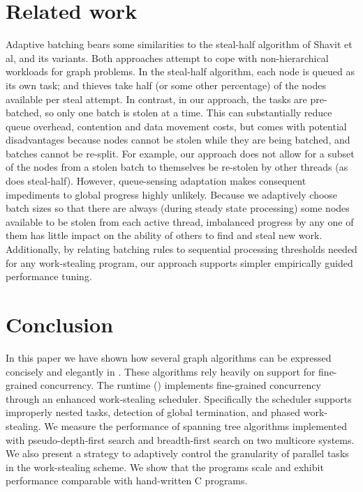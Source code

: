 \section{Related work}\label{sec:related}
Adaptive batching bears some similarities to the steal-half algorithm
of Shavit et al, and its variants. Both approaches attempt to cope
with non-hierarchical workloads for graph problems. In the steal-half
algorithm, each node is queued as its own task; and thieves take half
(or some other percentage) of the nodes available per steal
attempt. In contrast, in our approach, the tasks are pre-batched, so
only one batch is stolen at a time. This can substantially reduce
queue overhead, contention and data movement costs, but comes with
potential disadvantages because nodes cannot be stolen while they are
being batched, and batches cannot be re-split.  For example, our
approach does not allow for a subset of the nodes from a stolen batch
to themselves be re-stolen by other threads (as does
steal-half). However, queue-sensing adaptation makes consequent
impediments to global progress highly unlikely.  Because we adaptively
choose batch sizes so that there are always (during steady state
processing) some nodes available to be stolen from each active thread,
imbalanced progress by any one of them has little impact on the
ability of others to find and steal new work.  Additionally, by
relating batching rules to sequential processing thresholds needed for
any work-stealing program, our approach supports simpler empirically
guided performance tuning.
\section{Conclusion}\label{sec:concl}
In this paper we have shown how several graph algorithms can be
expressed concisely and elegantly in \Xten. These algorithms rely
heavily on support for fine-grained concurrency. The \Xten{} runtime
(\XWS) implements fine-grained concurrency through an enhanced
work-stealing scheduler. Specifically the scheduler supports
improperly nested tasks, detection of global termination, and phased
work-stealing.  We measure the performance of spanning tree algorithms
implemented with pseudo-depth-first search and breadth-first search on
two multicore systems. We also present a strategy to adaptively control the granularity of parallel tasks in the work-stealing scheme. We show that the \XWS{} programs scale and
exhibit performance comparable with hand-written C programs.

